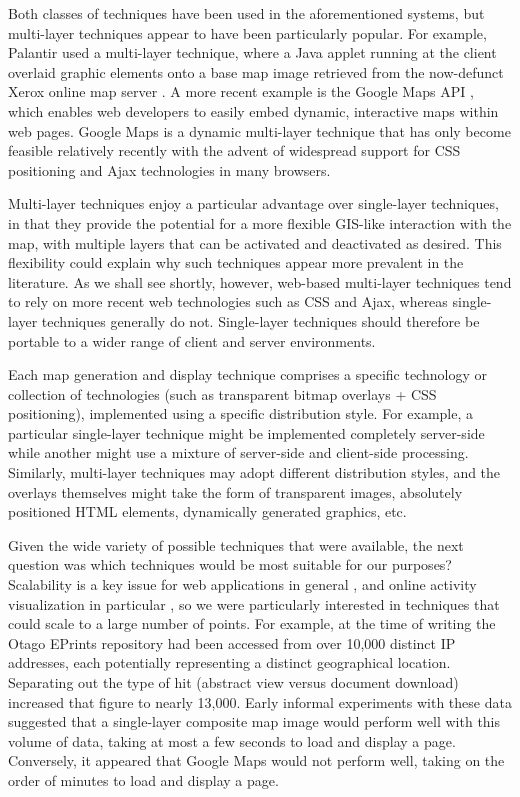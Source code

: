 \documentclass[acmnow]{acmtrans2m}
\begin{document}
Both classes of techniques have been used in the aforementioned systems,
but multi-layer techniques appear to have been particularly popular. For
example, Palantir used a multi-layer technique, where a Java applet running
at the client overlaid graphic elements onto a base map image retrieved
from the now-defunct Xerox online map server
\cite{Papa-N-1998-Palantir}. A more recent example is the Google Maps
API \cite{Goog-M-2006-maps}, which enables web developers to easily
embed dynamic, interactive maps within web pages. Google Maps is a
dynamic multi-layer technique that has only become feasible relatively
recently with the advent of widespread support for CSS positioning and
Ajax technologies in many browsers.

Multi-layer techniques enjoy a particular advantage over single-layer
techniques, in that they provide the potential for a more flexible
GIS-like interaction with the map, with multiple layers that can be
activated and deactivated as desired. This flexibility could explain why
such techniques appear more prevalent in the literature. As we shall see
shortly, however, web-based multi-layer techniques tend to rely on more
recent web technologies such as CSS and Ajax, whereas single-layer
techniques generally do not. Single-layer techniques should therefore be
portable to a wider range of client and server environments.

Each map generation and display technique comprises a specific
technology or collection of technologies (such as transparent bitmap
overlays + CSS positioning), implemented using a specific distribution
style. For example, a particular single-layer technique might be
implemented completely server-side while another might use a mixture of
server-side and client-side processing. Similarly, multi-layer
techniques may adopt different distribution styles, and the overlays
themselves might take the form of transparent images, absolutely
positioned HTML elements, dynamically generated graphics, etc.

Given the wide variety of possible techniques that were available, the
next question was which techniques would be most suitable for our
purposes? Scalability is a key issue for web applications in general
\cite[p.\ 28]{Offu-J-2002-quality}, and online activity visualization in
particular \cite[p.\ 50]{Eick-SG-2001-sitevis}, so we were particularly
interested in techniques that could scale to a large number of points.
For example, at the time of writing the Otago EPrints repository had
been accessed from over 10,000 distinct IP addresses, each potentially
representing a distinct geographical location. Separating out the type
of hit (abstract view versus document download) increased that figure to
nearly 13,000. Early informal experiments with these data suggested that
a single-layer composite map image would perform well with this volume
of data, taking at most a few seconds to load and display a page.
Conversely, it appeared that Google Maps would not perform well, taking
on the order of minutes to load and display a page.
\end{document}
